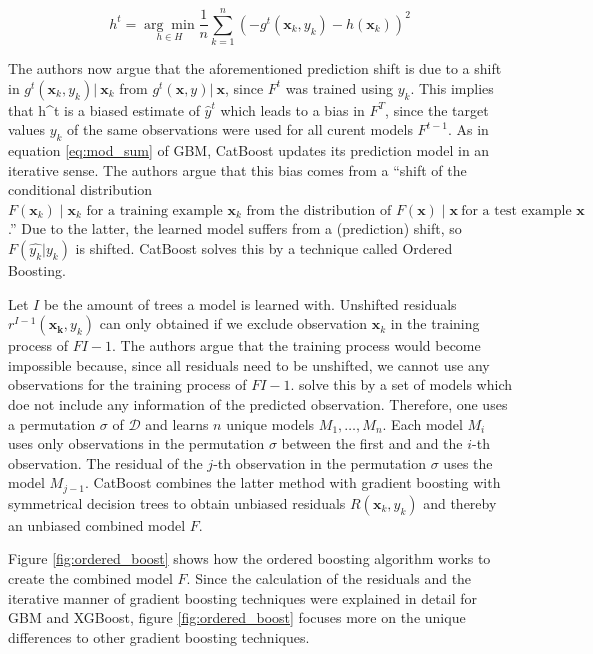 \documentclass[12pt,a4paper]{article}
\begin{document}
\begin{equation}
h^{t}=\underset{h \in H}{\arg \min } \frac{1}{n} \sum_{k=1}^{n}\left(-g^{t}\left(\mathbf{x}_{k}, y_{k}\right)-h\left(\mathbf{x}_{k}\right)\right)^{2}
\end{equation}

The authors now argue that the aforementioned prediction shift is due to a shift in \(g^{t}\left(\mathbf{x}_{k}, y_{k}\right)| \ \mathbf{x}_{k}\) from \(g^t(\mathbf{x},y)|\ \mathbf{x}\), since \(F^t\) was trained using \(y_k\). This implies that h\^{}t is a biased estimate of \(\hat{y}^t\) which leads to a bias in \(F^T\), since the target values \(y_k\) of the same observations were used for all curent models \(F^{t-1}\).
As in equation \ref{eq:mod_sum} of GBM, CatBoost updates its prediction model in an iterative sense. The authors argue that this bias comes from a ``shift of the conditional distribution \(F\left(\mathbf{x}_{k}\right) \mid \mathbf{x}_{k} \text { for a training example } \mathbf{x}_{k} \text { from the distribution of } F(\mathbf{x}) \mid \mathbf{x} \ \text {for a test example } \mathbf{x}\).'' Due to the latter, the learned model suffers from a (prediction) shift, so \(F(\hat{y_k}|y_k)\) is shifted. CatBoost solves this by a technique called Ordered Boosting.

Let \(I\) be the amount of trees a model is learned with. Unshifted residuals \(r^{I-1}(\mathbf{x_k},y_k)\) can only obtained if we exclude observation \(\mathbf{x}_k\) in the training process of \(F{I-1}\). The authors argue that the training process would become impossible because, since all residuals need to be unshifted, we cannot use any observations for the training process of \(F{I-1}\). \textcite{Prokhorenkova2019} solve this by a set of models which doe not include any information of the predicted observation. Therefore, one uses a permutation \(\sigma\) of \(\mathcal{D}\) and learns \(n\) unique models \(M_1,\ldots,M_n\). Each model \(M_i\) uses only observations in the permutation \(\sigma\) between the first and and the \(i\)-th observation. The residual of the \(j\)-th observation in the permutation \(\sigma\) uses the model \(M_{j-1}\). CatBoost combines the latter method with gradient boosting with symmetrical decision trees to obtain unbiased residuals \(R(\mathbf{x}_k,y_k)\) and thereby an unbiased combined model \(F\).

Figure \ref{fig:ordered_boost} shows how the ordered boosting algorithm works to create the combined model \(F\). Since the calculation of the residuals and the iterative manner of gradient boosting techniques were explained in detail for GBM and XGBoost, figure \ref{fig:ordered_boost} focuses more on the unique differences to other gradient boosting techniques.
\end{document}
